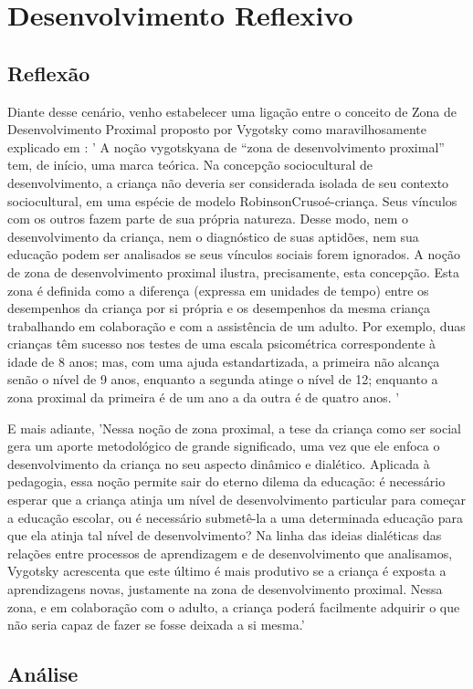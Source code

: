 \chapter{Desenvolvimento Reflexivo}



\section{Reflexão}

Diante desse cenário, venho estabelecer uma ligação entre o conceito de Zona de Desenvolvimento Proximal proposto por Vygotsky como maravilhosamente explicado em : '
A noção vygotskyana de “zona de desenvolvimento proximal” tem, de início, uma marca teórica. Na concepção sociocultural de
desenvolvimento, a criança não deveria ser considerada isolada de seu contexto sociocultural, em uma espécie de modelo RobinsonCrusoé-criança. Seus vínculos com os outros fazem parte de sua própria natureza. Desse modo, nem o desenvolvimento da criança, nem o diagnóstico de suas aptidões, nem sua educação podem ser analisados se seus vínculos sociais forem ignorados. A noção de zona de desenvolvimento proximal ilustra, precisamente, esta concepção. Esta zona é definida como a diferença (expressa em unidades de tempo) entre os desempenhos da criança por si própria e os desempenhos da mesma criança trabalhando em colaboração e com a assistência de um adulto. Por exemplo, duas crianças têm sucesso nos testes de uma escala psicométrica correspondente à idade de 8 anos; mas, com uma ajuda estandartizada, a primeira não alcança senão o nível de 9 anos, enquanto a segunda atinge o nível de 12; enquanto a zona proximal da primeira é de um ano a da outra é de quatro anos. '

E mais adiante, 'Nessa noção de zona proximal, a tese da criança como ser social gera um aporte metodológico de grande significado, uma vez que ele enfoca o desenvolvimento da criança no seu aspecto dinâmico e dialético. Aplicada à pedagogia, essa noção permite sair do eterno dilema da educação: é necessário esperar que a criança atinja um nível de desenvolvimento particular para começar a educação escolar, ou é necessário submetê-la a uma determinada educação para que ela atinja tal nível de desenvolvimento? Na linha das ideias dialéticas das relações entre processos de aprendizagem e de desenvolvimento que analisamos, Vygotsky acrescenta que este último é mais produtivo se a criança é exposta a aprendizagens novas, justamente na zona de desenvolvimento proximal. Nessa zona, e em colaboração com o adulto, a criança poderá facilmente adquirir o que não seria capaz de fazer se fosse deixada a si mesma.'


\section{Análise}
